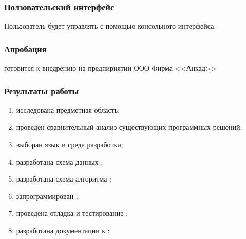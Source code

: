 \begin{frame}
\frametitle{Ползовательский интерфейс}
    Пользователь будет управлять {\ProgModule} с помощью
    консольного интерфейса.
\end{frame}

\begin{frame}
\frametitle{Апробация}
    {\ProgModule} готовится к внедрению на предпириятии ООО Фирма <<Анкад>>
\end{frame}

\begin{frame}
\frametitle{Результаты работы}
    \begin{enumerate}
        \item исследована предметная область;
        \item проведен сравнительный анализ существующих программных решений;
        \item выборан язык и среда разработки;
        \item разработана схема данных {\ProgModule};
        \item разработана схема алгоритма {\ProgModule};
        \item запрограммирован {\ProgModule};
        \item проведена отладка и тестирование {\ProgModule};
        \item разработана документации к {\ProgModule};
    \end{enumerate}
\end{frame}
